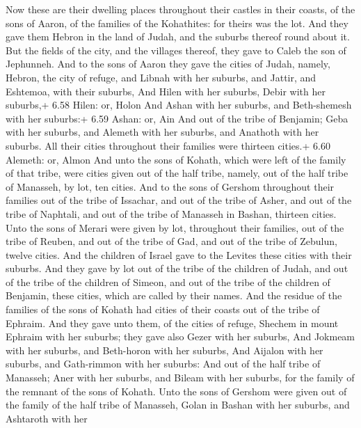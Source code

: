  Now these are their dwelling places throughout their
castles in their coasts, of the sons of Aaron, of the families of the
Kohathites: for theirs was the lot.  And they gave them
Hebron in the land of Judah, and the suburbs thereof round about it.
 But the fields of the city, and the villages thereof, they
gave to Caleb the son of Jephunneh.  And to the sons of
Aaron they gave the cities of Judah, namely, Hebron, the city of refuge,
and Libnah with her suburbs, and Jattir, and Eshtemoa, with their
suburbs,  And Hilen with her suburbs, Debir with her
suburbs,+ 6.58 Hilen: or, Holon  And Ashan with her
suburbs, and Beth-shemesh with her suburbs:+ 6.59 Ashan: or, Ain
 And out of the tribe of Benjamin; Geba with her suburbs,
and Alemeth with her suburbs, and Anathoth with her suburbs. All their
cities throughout their families were thirteen cities.+ 6.60 Alemeth:
or, Almon  And unto the sons of Kohath, which were left of
the family of that tribe, were cities given out of the half tribe,
namely, out of the half tribe of Manasseh, by lot, ten cities.
 And to the sons of Gershom throughout their families out
of the tribe of Issachar, and out of the tribe of Asher, and out of the
tribe of Naphtali, and out of the tribe of Manasseh in Bashan, thirteen
cities.  Unto the sons of Merari were given by lot,
throughout their families, out of the tribe of Reuben, and out of the
tribe of Gad, and out of the tribe of Zebulun, twelve cities.
 And the children of Israel gave to the Levites these
cities with their suburbs.  And they gave by lot out of the
tribe of the children of Judah, and out of the tribe of the children of
Simeon, and out of the tribe of the children of Benjamin, these cities,
which are called by their names.  And the residue of the
families of the sons of Kohath had cities of their coasts out of the
tribe of Ephraim.  And they gave unto them, of the cities
of refuge, Shechem in mount Ephraim with her suburbs; they gave also
Gezer with her suburbs,  And Jokmeam with her suburbs, and
Beth-horon with her suburbs,  And Aijalon with her suburbs,
and Gath-rimmon with her suburbs:  And out of the half
tribe of Manasseh; Aner with her suburbs, and Bileam with her suburbs,
for the family of the remnant of the sons of Kohath.  Unto
the sons of Gershom were given out of the family of the half tribe of
Manasseh, Golan in Bashan with her suburbs, and Ashtaroth with her
